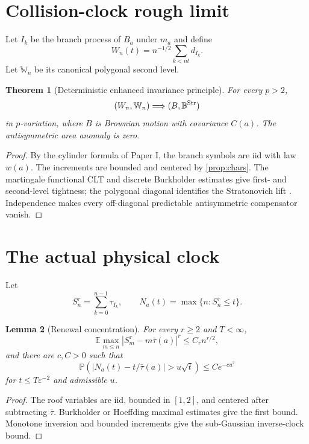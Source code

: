 \documentclass[11pt,reqno]{amsart}
\newtheorem{theorem}{Theorem}[section]
\newtheorem{lemma}[theorem]{Lemma}
\theoremstyle{remark}
\newcommand{\E}{\mathbb E}
\newcommand{\Pp}{\mathbb P}
\newcommand{\abs}[1]{\left\lvert #1\right\rvert}
\begin{document}
\section{Collision-clock rough limit}
Let $I_k$ be the branch process of $B_a$ under $m_a$ and define
\[
 W_n(t)=n^{-1/2}\sum_{k<nt}d_{I_k}.
\]
Let $\mathbb W_n$ be its canonical polygonal second level.

\begin{theorem}[Deterministic enhanced invariance principle]\label{thm:rough}
For every $p>2$,
\[
 (W_n,\mathbb W_n)\Longrightarrow(B,\mathbb B^{\rm Str})
\]
in $p$-variation, where $B$ is Brownian motion with covariance $C(a)$.  The
antisymmetric area anomaly is zero.
\end{theorem}
\begin{proof}
By the cylinder formula of Paper I, the branch symbols are iid with law $w(a)$.
The increments are bounded and centered by \cref{prop:chars}.  The martingale
functional CLT and discrete Burkholder estimates give first- and second-level
tightness; the polygonal diagonal identifies the Stratonovich lift
\cite{HallHeyde1980,FrizHairer2014}.  Independence makes every off-diagonal
predictable antisymmetric compensator vanish.
\end{proof}

\section{The actual physical clock}
Let
\[
 S_n^\tau=\sum_{k=0}^{n-1}\tau_{I_k},\qquad
 N_a(t)=\max\{n:S_n^\tau\le t\}.
\]

\begin{lemma}[Renewal concentration]\label{lem:renewal}
For every $r\ge2$ and $T<\infty$,
\[
 \E\max_{m\le n}\abs{S_m^\tau-m\bar\tau(a)}^r
 \le C_rn^{r/2},
\]
and there are $c,C>0$ such that
\[
 \Pp\left(
 \abs{N_a(t)-t/\bar\tau(a)}>u\sqrt t
 \right)\le Ce^{-cu^2}
\]
for $t\le T\varepsilon^{-2}$ and admissible $u$.
\end{lemma}
\begin{proof}
The roof variables are iid, bounded in $[1,2]$, and centered after subtracting
$\bar\tau$.  Burkholder or Hoeffding maximal estimates give the first bound.
Monotone inversion and bounded increments give the sub-Gaussian inverse-clock
bound.
\end{proof}
\end{document}
